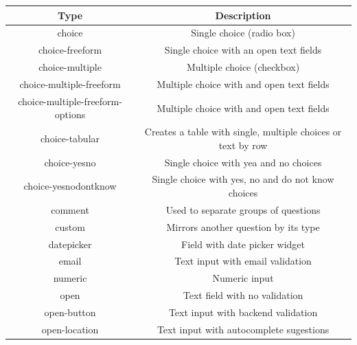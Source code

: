 \begin{longtable}[c]{|c|c|}
\hline
\textbf{Type}                     & \textbf{Description}                                        \\ \hline
\endhead
choice                            & Single choice (radio box)                                   \\ \hline
choice-freeform                   & Single choice with an open text fields                      \\ \hline
choice-multiple                   & Multiple choice (checkbox)                                  \\ \hline
choice-multiple-freeform          & Multiple choice with and open text fields                   \\ \hline
choice-multiple-freeform-options  & Multiple choice with and open text fields                   \\ \hline
choice-tabular                    & Creates a table with single, multiple choices or text by row      \\ \hline
choice-yesno                      & Single choice with yea and no choices                       \\ \hline
choice-yesnodontknow              & Single choice with yes, no and do not know choices          \\ \hline
comment                           & Used to separate groups of questions                        \\ \hline
custom                            & Mirrors another question by its type                        \\ \hline
datepicker                        & Field with date picker widget                               \\ \hline
email                             & Text input with email validation                            \\ \hline
numeric                           & Numeric input                                               \\ \hline
open                              & Text field with no validation                               \\ \hline
open-button                       & Text input with backend validation                          \\ \hline
open-location                     & Text input with autocomplete sugestions                     \\ \hline

\end{longtable}

